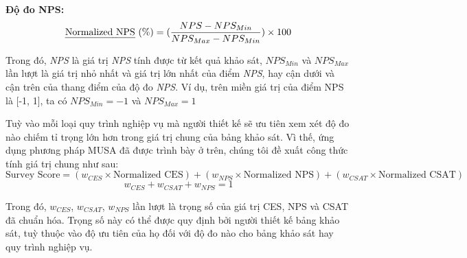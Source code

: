 \textbf{Độ đo NPS:}
\[ \text{\emph{Normalized NPS} (\%)} = (\frac{NPS - NPS_{Min}}{NPS_{Max} - NPS_{Min}}) \times 100\]
\par
Trong đó, \emph{NPS} là giá trị \emph{NPS} tính được từ kết quả khảo sát, $NPS_{Min}$ và $NPS_{Max}$ lần lượt là giá trị nhỏ nhất và giá trị lớn nhất của điểm \emph{NPS}, hay cận dưới và cận trên của thang điểm của độ đo \emph{NPS}. Ví dụ, trên miền giá trị của điểm NPS là [-1, 1], ta có $NPS_{Min} = -1$ và $NPS_{Max} = 1$
\par
Tuỳ vào mỗi loại quy trình nghiệp vụ mà người thiết kế sẽ ưu tiên xem xét độ đo nào chiếm tỉ trọng lớn hơn trong giá trị chung của bảng khảo sát. Vì thế, ứng dụng phương pháp MUSA đã được trình bày ở trên, chúng tôi đề xuất công thức tính giá trị chung như sau:
\[ \text{Survey Score}= (w_{CES} \times \text{Normalized CES}) + (w_{NPS} \times \text{Normalized NPS}) + (w_{CSAT} \times \text{Normalized CSAT})\]
\[ w_{CES} + w_{CSAT} + w_{NPS} = 1\]
\par
Trong đó, $w_{CES}$, $w_{CSAT}$, $w_{NPS}$ lần lượt là trọng số của giá trị CES, NPS và CSAT đã chuẩn hóa. Trọng số này có thể được quy định bởi người thiết kế bảng khảo sát, tuỳ thuộc vào độ ưu tiên của họ đối với độ đo nào cho bảng khảo sát hay quy trình nghiệp vụ.

